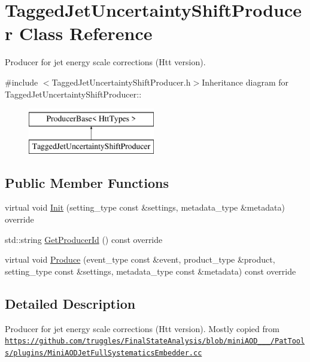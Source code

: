 \hypertarget{classTaggedJetUncertaintyShiftProducer}{
\section{TaggedJetUncertaintyShiftProducer Class Reference}
\label{classTaggedJetUncertaintyShiftProducer}
}


Producer for jet energy scale corrections (Htt version).  


{\ttfamily \#include $<$TaggedJetUncertaintyShiftProducer.h$>$}Inheritance diagram for TaggedJetUncertaintyShiftProducer::\begin{figure}[H]
\begin{center}
\leavevmode
\includegraphics[height=2cm]{classTaggedJetUncertaintyShiftProducer}
\end{center}
\end{figure}
\subsection*{Public Member Functions}
\begin{DoxyCompactItemize}
\item 
virtual void \hyperlink{classTaggedJetUncertaintyShiftProducer_ac0810ddb6c73d8e1ff9fc55a801b6046}{Init} (setting\_\-type const \&settings, metadata\_\-type \&metadata) override
\item 
std::string \hyperlink{classTaggedJetUncertaintyShiftProducer_a8c04af8f7018d1e03f14f4bf89b90a0d}{GetProducerId} () const override
\item 
virtual void \hyperlink{classTaggedJetUncertaintyShiftProducer_a45171dc99c8a5f63ecdb9531831c473a}{Produce} (event\_\-type const \&event, product\_\-type \&product, setting\_\-type const \&settings, metadata\_\-type const \&metadata) const override
\end{DoxyCompactItemize}


\subsection{Detailed Description}
Producer for jet energy scale corrections (Htt version). Mostly copied from \href{https://github.com/truggles/FinalStateAnalysis/blob/miniAOD_8_0_25/PatTools/plugins/MiniAODJetFullSystematicsEmbedder.cc}{\tt https://github.com/truggles/FinalStateAnalysis/blob/miniAOD\_\_\_/PatTools/plugins/MiniAODJetFullSystematicsEmbedder.cc}

